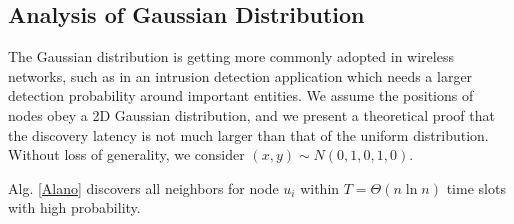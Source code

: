 \subsection{Analysis of Gaussian Distribution}
\label{normal}
The Gaussian distribution is getting more commonly adopted in wireless
networks, such as in
an intrusion detection application which needs a larger detection
probability around important entities\cite{wang2013gaussian}. We assume
the positions of nodes obey a 2D Gaussian distribution, and we present a
theoretical proof that the discovery latency is not much larger than
that of the uniform distribution. Without loss of generality, we consider
$(x,y) \sim N(0,1,0,1,0)$.

\begin{theorem}
Alg. \ref{Alano} discovers all neighbors for node $u_i$ within $T=\Theta(n\ln n)$ time slots with high probability.
\end{theorem}


